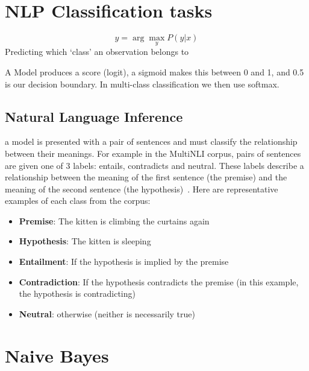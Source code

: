 \documentclass[11pt]{article}
\begin{document}


\tableofcontents

\clearpage

\section{NLP Classification tasks}

\begin{definition}[Classification]
    \begin{equation}
        \hat{y} = \arg\max_y P(y|x)    
    \end{equation}
    Predicting which `class' an observation belongs to
\end{definition}

A Model produces a score (logit), a sigmoid makes this between 0 and 1, and 0.5 is our decision boundary. In multi-class classification we then use softmax.

\subsection{Natural Language Inference}

a model is presented with a pair of sentences and must classify the relationship between their meanings. For example in the MultiNLI corpus, pairs of sentences are given one of 3 labels: entails, contradicts and neutral. These labels describe a relationship between the meaning of the first sentence (the premise) and the meaning of the second sentence (the hypothesis)~\cite{book-speech-and-language-processing}. Here are representative examples of each class from the corpus:

\begin{itemize}
    \item \textbf{Premise}: The kitten is climbing the curtains again
    \item \textbf{Hypothesis}: The kitten is sleeping
    \item \textbf{Entailment}: If the hypothesis is implied by the premise
    \item \textbf{Contradiction}: If the hypothesis contradicts the premise (in this example, the hypothesis is contradicting)
    \item \textbf{Neutral}: otherwise (neither is necessarily true)
\end{itemize}

\section{Naive Bayes}
\end{document}
